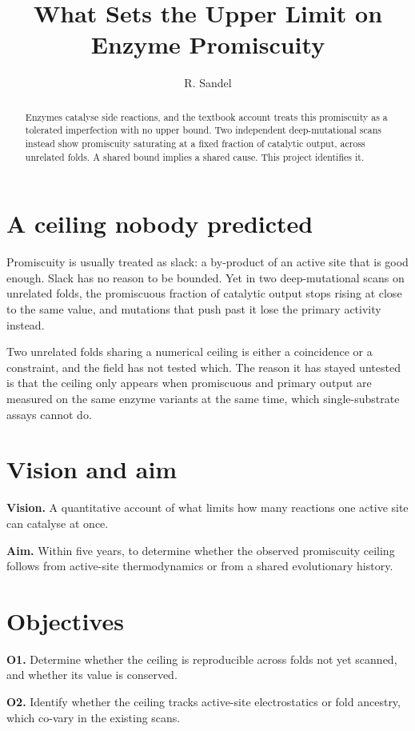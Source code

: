\documentclass[11pt,a4paper]{article}
\title{What Sets the Upper Limit on Enzyme Promiscuity}
\author[Sandel]{R. Sandel}
\begin{document}
\maketitle

\begin{abstract}
Enzymes catalyse side reactions, and the textbook account treats this promiscuity as a
tolerated imperfection with no upper bound. Two independent deep-mutational scans
instead show promiscuity saturating at a fixed fraction of catalytic output, across
unrelated folds. A shared bound implies a shared cause. This project identifies it.
\end{abstract}

\startsectiona

\section{A ceiling nobody predicted}
Promiscuity is usually treated as slack: a by-product of an active site that is good
enough. Slack has no reason to be bounded. Yet in two deep-mutational scans on
unrelated folds, the promiscuous fraction of catalytic output stops rising at close to
the same value, and mutations that push past it lose the primary activity instead.

Two unrelated folds sharing a numerical ceiling is either a coincidence or a
constraint, and the field has not tested which. The reason it has stayed untested is
that the ceiling only appears when promiscuous and primary output are measured on the
same enzyme variants at the same time, which single-substrate assays cannot do.

\section{Vision and aim}
\textbf{Vision.} A quantitative account of what limits how many reactions one active
site can catalyse at once.

\textbf{Aim.} Within five years, to determine whether the observed promiscuity ceiling
follows from active-site thermodynamics or from a shared evolutionary history.

\section{Objectives}
\textbf{O1.} Determine whether the ceiling is reproducible across folds not yet
scanned, and whether its value is conserved.

\textbf{O2.} Identify whether the ceiling tracks active-site electrostatics or fold
ancestry, which co-vary in the existing scans.
\end{document}
